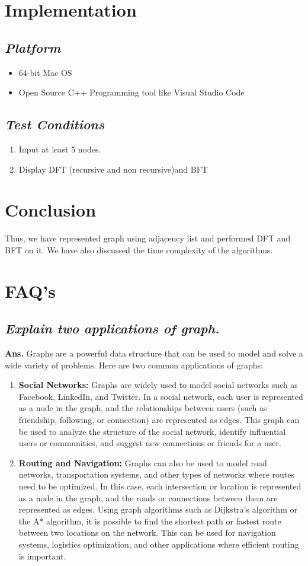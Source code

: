 \documentclass{article}
\begin{document}
\section{\textbf{Implementation}}
\subsection{\textit{Platform}}
\begin{itemize}
	\item 64-bit Mac OS
	\item Open Source C++ Programming tool like Visual Studio Code
\end{itemize}
\subsection{\textit{Test Conditions}}
\begin{enumerate}
    \item Input at least 5 nodes.
    \item Display DFT (recursive and non recursive)and BFT
\end{enumerate}
\section{\textbf{Conclusion}}
Thus, we have represented graph using adjacency list and performed DFT and BFT on it. We have also discussed the time complexity of the algorithms.
\section{\textbf{FAQ's}}
\subsection{\textit{Explain two applications of graph.}}
\textbf{Ans.} Graphs are a powerful data structure that can be used to model and solve a wide variety of problems. Here are two common applications of graphs:
\begin{enumerate}
    \item \textbf{Social Networks:} Graphs are widely used to model social networks such as Facebook, LinkedIn, and Twitter. In a social network, each user is represented as a node in the graph, and the relationships between users (such as friendship, following, or connection) are represented as edges. This graph can be used to analyze the structure of the social network, identify influential users or communities, and suggest new connections or friends for a user.
    \item \textbf{Routing and Navigation:} Graphs can also be used to model road networks, transportation systems, and other types of networks where routes need to be optimized. In this case, each intersection or location is represented as a node in the graph, and the roads or connections between them are represented as edges. Using graph algorithms such as Dijkstra's algorithm or the A* algorithm, it is possible to find the shortest path or fastest route between two locations on the network. This can be used for navigation systems, logistics optimization, and other applications where efficient routing is important.
\end{enumerate}
\end{document}
